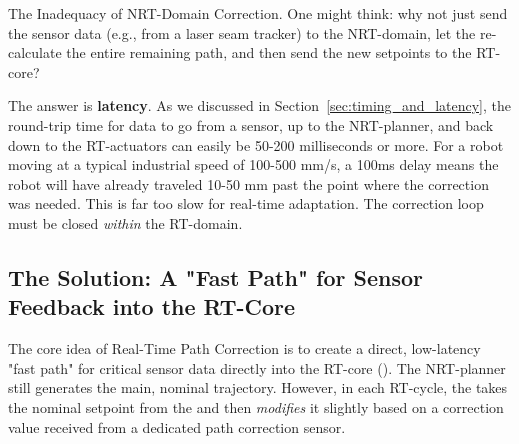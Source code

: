 \begin{dangerbox}{The Inadequacy of NRT-Domain Correction.}
    One might think: why not just send the sensor data (e.g., from a laser seam tracker) to the NRT-domain, let the  re-calculate the entire remaining path, and then send the new setpoints to the RT-core?
    
    The answer is \textbf{latency}. As we discussed in Section~\ref{sec:timing_and_latency}, the round-trip time for data to go from a sensor, up to the NRT-planner, and back down to the RT-actuators can easily be 50-200 milliseconds or more. For a robot moving at a typical industrial speed of 100-500 mm/s, a 100ms delay means the robot will have already traveled 10-50 mm past the point where the correction was needed. This is far too slow for real-time adaptation. The correction loop must be closed \textit{within} the RT-domain.
\end{dangerbox}

\subsection{The Solution: A "Fast Path" for Sensor Feedback into the RT-Core}
\label{subsec:path_correction_solution}

The core idea of Real-Time Path Correction is to create a direct, low-latency "fast path" for critical sensor data directly into the RT-core (). The NRT-planner still generates the main, nominal trajectory. However, in each RT-cycle, the  takes the nominal setpoint from the  and then \textit{modifies} it slightly based on a correction value received from a dedicated path correction sensor.

